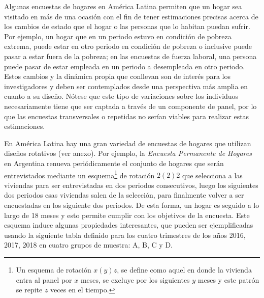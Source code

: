 \documentclass[
  10pt,
  spanish,
]{book}
\begin{document}
Algunas encuestas de hogares en América Latina permiten que un hogar sea visitado en más de una ocasión con el fin de tener estimaciones precisas acerca de los cambios de estado que el hogar o las personas que lo habitan puedan sufrir. Por ejemplo, un hogar que en un periodo estuvo en condición de pobreza extrema, puede estar en otro periodo en condición de pobreza o inclusive puede pasar a estar fuera de la pobreza; en las encuestas de fuerza laboral, una persona puede pasar de estar empleada en un periodo a desempleada en otro periodo. Estos cambios y la dinámica propia que conllevan son de interés para los investigadores y deben ser contemplados desde una perspectiva más amplia en cuanto a su diseño. Nótese que este tipo de variaciones sobre los individuos necesariamente tiene que ser captada a través de un componente de panel, por lo que las encuestas transversales o repetidas no serían viables para realizar estas estimaciones.

En América Latina hay una gran variedad de encuestas de hogares que utilizan diseños rotativos (ver anexo). Por ejemplo, la \emph{Encuesta Permanente de Hogares} en Argentina renueva periódicamente el conjunto de hogares que serán entrevistados mediante un esquema\footnote{Un esquema de rotación \(x(y)z\), se define como aquel en donde la vivienda entra al panel por \(x\) meses, se excluye por los siguientes \(y\) meses y este patrón se repite \(z\) veces en el tiempo.} de rotación \(2(2)2\) que selecciona a las viviendas para ser entrevistadas en dos periodos consecutivos, luego los siguientes dos periodos esas viviendas salen de la selección, para finalmente volver a ser encuestadas en los siguiente dos periodos. De esta forma, un hogar es seguido a lo largo de 18 meses y esto permite cumplir con los objetivos de la encuesta. Este esquema induce algunas propiedades interesantes, que pueden ser ejemplificadas usando la siguiente tabla definido para los cuatro trimestres de los años 2016, 2017, 2018 en cuatro grupos de muestra: A, B, C y D.
\end{document}
